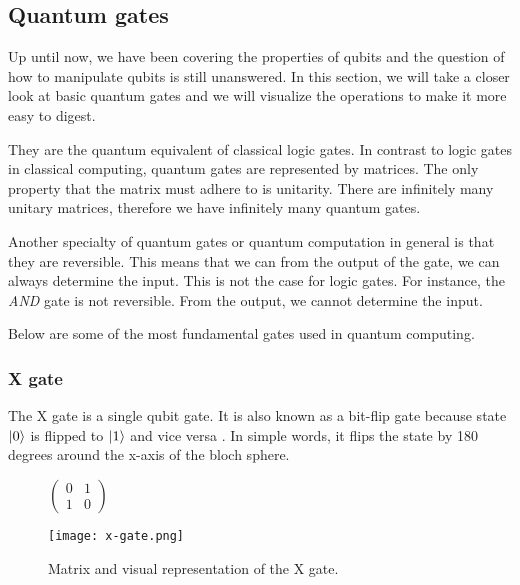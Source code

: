\subsection{Quantum gates}
Up until now, we have been covering the properties of qubits and the question of how to manipulate qubits is still unanswered. In this section, we will take a closer look at basic quantum gates and we will visualize the operations to make it more easy to digest.

They are the quantum equivalent of classical logic gates. In contrast to logic gates in classical computing, quantum gates are represented by matrices. The only property that the matrix must adhere to is unitarity. There are infinitely many unitary matrices, therefore we have infinitely many quantum gates. \cite{qc}

Another specialty of quantum gates or quantum computation in general is that they are reversible. This means that we can from the output of the gate, we can always determine the input. This is not the case for logic gates. For instance, the \textit{AND} gate is not reversible. From the output, we cannot determine the input. \cite{qc}

Below are some of the most fundamental gates used in quantum computing.
\subsubsection{X gate}
The X gate is a single qubit gate. It is also known as a bit-flip gate because state $\lvert0\rangle$ is flipped to $\lvert1\rangle$ and vice versa \cite{qc}. In simple words, it flips the state by 180 degrees around the x-axis of the bloch sphere.

\begin{figure}[H]
    \centering
    \begin{minipage}{0.4\linewidth}
      \centering
      $\begin{pmatrix}
        0 & 1 \\
        1 & 0
        \end{pmatrix}$
      \vfill
    \end{minipage}
    \begin{minipage}{0.25\linewidth}
      \centering
      \texttt{[image: x-gate.png]}
      \vfill
    \end{minipage}
    \caption{Matrix and visual representation of the X gate.}
\end{figure}


